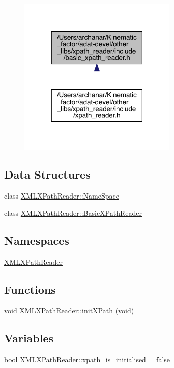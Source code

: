 \begin{figure}[H]
\begin{center}
\leavevmode
\includegraphics[width=214pt]{d8/d9e/adat-devel_2other__libs_2xpath__reader_2include_2basic__xpath__reader_8h__dep__incl}
\end{center}
\end{figure}
\subsection*{Data Structures}
\begin{DoxyCompactItemize}
\item 
class \mbox{\hyperlink{classXMLXPathReader_1_1NameSpace}{X\+M\+L\+X\+Path\+Reader\+::\+Name\+Space}}
\item 
class \mbox{\hyperlink{classXMLXPathReader_1_1BasicXPathReader}{X\+M\+L\+X\+Path\+Reader\+::\+Basic\+X\+Path\+Reader}}
\end{DoxyCompactItemize}
\subsection*{Namespaces}
\begin{DoxyCompactItemize}
\item 
 \mbox{\hyperlink{namespaceXMLXPathReader}{X\+M\+L\+X\+Path\+Reader}}
\end{DoxyCompactItemize}
\subsection*{Functions}
\begin{DoxyCompactItemize}
\item 
void \mbox{\hyperlink{namespaceXMLXPathReader_a3eaf7514c0fa46eb783802d88bbebb97}{X\+M\+L\+X\+Path\+Reader\+::init\+X\+Path}} (void)
\end{DoxyCompactItemize}
\subsection*{Variables}
\begin{DoxyCompactItemize}
\item 
bool \mbox{\hyperlink{namespaceXMLXPathReader_a2622cebb93cd752913bf8e9db036f339}{X\+M\+L\+X\+Path\+Reader\+::xpath\+\_\+is\+\_\+initialised}} = false
\end{DoxyCompactItemize}
